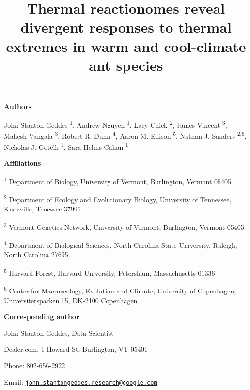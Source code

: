 \documentclass[]{article}
\title{Thermal reactionomes reveal divergent responses to thermal extremes in
warm and cool-climate ant species}
\author{}
\date{}
\begin{document}
\maketitle


\linenumbers

\newpage

\textbf{Authors}

John Stanton-Geddes \textsuperscript{1}, Andrew Nguyen
\textsuperscript{1}, Lacy Chick \textsuperscript{2}, James Vincent
\textsuperscript{3}, Mahesh Vangala \textsuperscript{3}, Robert R. Dunn
\textsuperscript{4}, Aaron M. Ellison \textsuperscript{5}, Nathan J.
Sanders \textsuperscript{2,6}, Nicholas J. Gotelli \textsuperscript{1},
Sara Helms Cahan \textsuperscript{1}

\vspace{10 mm}

\textbf{Affiliations}

\textsuperscript{1} Department of Biology, University of Vermont,
Burlington, Vermont 05405 \newline

\textsuperscript{2} Department of Ecology and Evolutionary Biology,
University of Tennessee, Knoxville, Tenessee 37996 \newline

\textsuperscript{3} Vermont Genetics Network, University of Vermont,
Burlington, Vermont 05405 \newline

\textsuperscript{4} Department of Biological Sciences, North Carolina
State University, Raleigh, North Carolina 27695 \newline

\textsuperscript{5} Harvard Forest, Harvard University, Petersham,
Massachusetts 01336 \newline

\textsuperscript{6} Center for Macroecology, Evolution and Climate,
University of Copenhagen, Universitetsparken 15, DK-2100 Copenhagen

\vspace{10 mm}

\textbf{Corresponding author}

John Stanton-Geddes, Data Scientist

Dealer.com, 1 Howard St, Burlington, VT 05401

Phone: 802-656-2922

Email:
\href{mailto:john.stantongeddes.research@google.com}{\nolinkurl{john.stantongeddes.research@google.com}}
\end{document}
